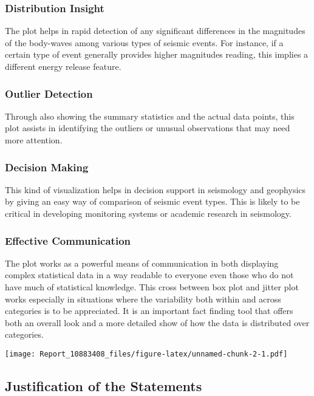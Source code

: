 \documentclass[
]{article}
\begin{document}
\subsubsection{Distribution Insight}\label{distribution-insight}

The plot helps in rapid detection of any significant differences in the
magnitudes of the body-waves among various types of seismic events. For
instance, if a certain type of event generally provides higher
magnitudes reading, this implies a different energy release feature.

\subsubsection{Outlier Detection}\label{outlier-detection}

Through also showing the summary statistics and the actual data points,
this plot assists in identifying the outliers or unusual observations
that may need more attention.

\subsubsection{Decision Making}\label{decision-making}

This kind of visualization helps in decision support in seismology and
geophysics by giving an easy way of comparison of seismic event types.
This is likely to be critical in developing monitoring systems or
academic research in seismology.

\subsubsection{Effective Communication}\label{effective-communication}

The plot works as a powerful means of communication in both displaying
complex statistical data in a way readable to everyone even those who do
not have much of statistical knowledge. This cross between box plot and
jitter plot works especially in situations where the variability both
within and across categories is to be appreciated. It is an important
fact finding tool that offers both an overall look and a more detailed
show of how the data is distributed over categories.

\texttt{[image: Report\_10883408\_files/figure-latex/unnamed-chunk-2-1.pdf]}

\subsection{Justification of the
Statements}\label{justification-of-the-statements-1}
\end{document}
